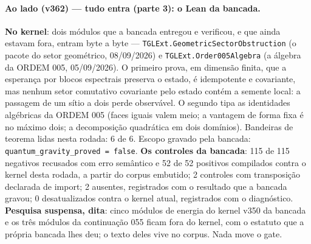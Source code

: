 \documentclass[11pt]{article}
\theoremstyle{definition}\newtheorem{deriv}{Derivação}
\begin{document}
\paragraph*{Ao lado (v362) --- tudo entra (parte 3): o Lean da bancada.} \textbf{No kernel}: dois módulos que a bancada entregou e verificou, e que ainda estavam fora, entram byte a byte --- \texttt{TGLExt.GeometricSectorObstruction} (o pacote do setor geométrico, 08/09/2026) e \texttt{TGLExt.Order005Algebra} (a álgebra da ORDEM 005, 05/09/2026). O primeiro prova, em dimensão finita, que a esperança por blocos espectrais preserva o estado, é idempotente e covariante, mas nenhum setor comutativo covariante pelo estado contém a semente local: a passagem de um sítio a dois perde observável. O segundo tipa as identidades algébricas da ORDEM 005 (faces iguais valem meio; a vantagem de forma fixa é no máximo dois; a decomposição quadrática em dois domínios). Bandeiras de teorema lidas nesta rodada: 6 de 6. Escopo gravado pela bancada: \texttt{quantum\_gravity\_proved = false}. \textbf{Os controles da bancada}: 115 de 115 negativos recusados com erro semântico e 52 de 52 positivos compilados contra o kernel desta rodada, a partir do corpus embutido; 2 controles com transposição declarada de import; 2 ausentes, registrados com o resultado que a bancada gravou; 0 desatualizados contra o kernel atual, registrados com o diagnóstico. \textbf{Pesquisa suspensa, dita}: cinco módulos de energia do kernel v350 da bancada e os três módulos da continuação 055 ficam fora do kernel, com o estatuto que a própria bancada lhes deu; o texto deles vive no corpus. Nada move o gate.
\end{document}
